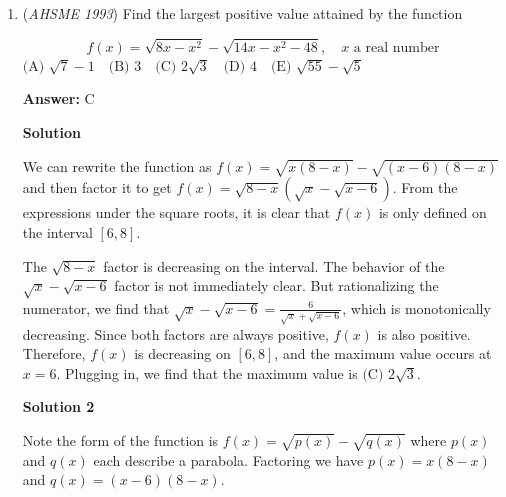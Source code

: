 \begin{enumerate}
 Now observe $\triangle AA'P$ and $\triangle OO'P$.  We have $m\angle A = 60^\circ$ and $m \angle O = 60^\circ$, therefore $\angle A \cong \angle O$.  By our construction of moving the points the same distance, we have $AA' = OO'$.  Also, $AP = OP$ by the original equilateral triangle.  Therefore, by SAS congruence, $\triangle AA'P \cong \triangle OO'P$.  

 Now, look at $\triangle A'PO'$.  We have $PA' = PO'$ from the above congruence.  We also have the included angle $\angle A'PO'$ is $60^\circ$.  To prove that, start with the $60^\circ$ angle $APO$, subtract the angle $APA'$, and add the congruent angle $OPO'$.

 Since $\triangle A'PO'$ is an isosceles triangle with vertex of $60^\circ$, it is equilateral.

 


	\item (\textit{AHSME 1993}) Find the largest positive value attained by the function

 \[f(x)=\sqrt{8x-x^2}-\sqrt{14x-x^2-48} ,\quad x  \text{  a real number}\]
$\text{(A) } \sqrt{7}-1\quad \text{(B) } 3\quad \text{(C) } 2\sqrt{3}\quad \text{(D) } 4\quad \text{(E) } \sqrt{55}-\sqrt{5}$

 \textbf{Answer: }C



\textbf{Solution}

We can rewrite the function as $f(x) = \sqrt{x (8 - x)} - \sqrt{(x - 6) (8 - x)}$ and then factor it to get $f(x) = \sqrt{8 - x} \left(\sqrt{x} - \sqrt{x - 6}\right)$. From the expressions under the square roots, it is clear that $f(x)$ is only defined on the interval $[6, 8]$.

 The $\sqrt{8 - x}$ factor is decreasing on the interval. The behavior of the $\sqrt{x} - \sqrt{x - 6}$ factor is not immediately clear. But rationalizing the numerator, we find that $\sqrt{x} - \sqrt{x - 6} = \frac{6}{\sqrt{x} + \sqrt{x - 6}}$, which is monotonically decreasing. Since both factors are always positive, $f(x)$ is also positive. Therefore, $f(x)$ is decreasing on $[6, 8]$, and the maximum value occurs at $x = 6$. Plugging in, we find that the maximum value is $\boxed{\text{(C) } 2\sqrt{3}}$.

 



\textbf{Solution 2}

Note the form of the function is $f(x) = \sqrt{ p(x)} - \sqrt{q(x)}$ where $p(x)$ and $q(x)$ each describe a parabola.  Factoring we have $p(x) = x(8-x)$ and $q(x) = (x-6)(8-x)$.  


\end{enumerate}
